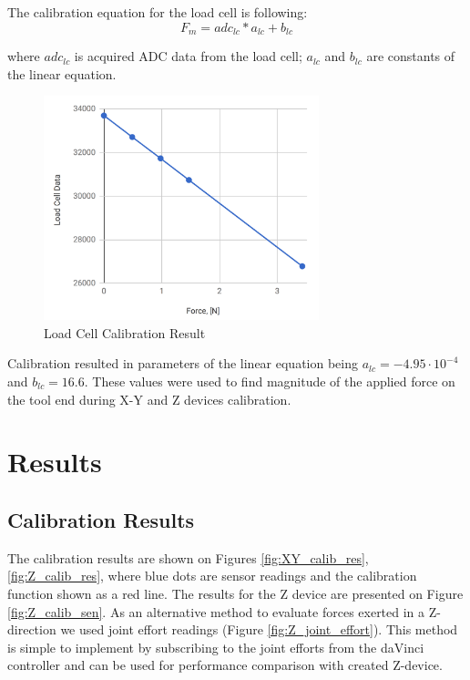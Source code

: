	The calibration equation for the load cell is following:
\begin{equation}
F_{m} = adc_{lc}*a_{lc} + b_{lc}
\end{equation}

	where $adc_{lc}$ is acquired ADC data from the load cell; $a_{lc}$ and $b_{lc}$ are constants of the linear equation.

\begin{figure}[h]
	\begin{center}
	\includegraphics[width=80mm]{fig/methods/load_cell_calib_data.png}
	\end{center}
	\vspace{-4mm}
	\caption[Load Cell Calibration Result]
	{Load Cell Calibration Result}
	\label{fig:LC_calib_res}
	\vspace{-2mm}
\end{figure}

	Calibration resulted in parameters of the linear equation being  $a_{lc} = -4.95 \cdot 10^{-4}$ and $b_{lc} = 16.6$. These values were used to find magnitude of the applied force on the tool end during X-Y and Z devices calibration.

\section{Results}
\label{sec:res}

\subsection{Calibration Results}
\label{ssec:Cal_Res}

The calibration results are shown on Figures \ref{fig:XY_calib_res}, \ref{fig:Z_calib_res}, where blue dots are sensor readings and the calibration function shown as a red line. The results for the Z device are presented on Figure \ref{fig:Z_calib_sen}. As an alternative method to evaluate forces exerted in a Z-direction we used joint effort readings (Figure \ref{fig:Z_joint_effort}). This method is simple to implement by subscribing to the joint efforts from the daVinci controller and can be used for performance comparison with created Z-device.

